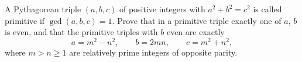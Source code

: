 A Pythagorean triple $(a,b,c)$ of positive integers with $a^2+b^2=c^2$ is called primitive if $\gcd(a,b,c)=1$. Prove that in a primitive triple exactly one of $a$, $b$ is even, and that the primitive triples with $b$ even are exactly
\[a=m^2-n^2,\qquad b=2mn,\qquad c=m^2+n^2,\]
where $m>n\ge1$ are relatively prime integers of opposite parity.
